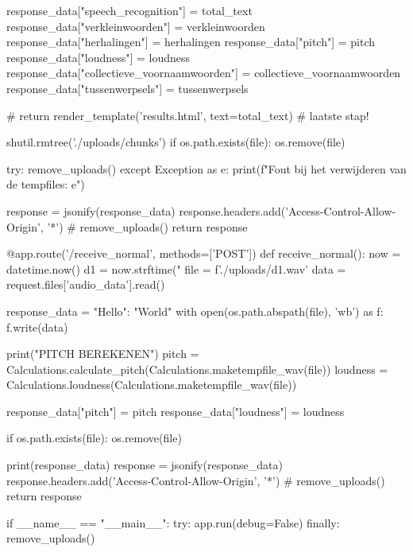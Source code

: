 \begin{python}
   response_data["speech_recognition"] = total_text
   response_data["verkleinwoorden"] = verkleinwoorden
   response_data["herhalingen"] = herhalingen
   response_data["pitch"] = pitch
   response_data["loudness"] = loudness
   response_data["collectieve_voornaamwoorden"] = collectieve_voornaamwoorden
   response_data["tussenwerpsels"] = tussenwerpsels

   # return render_template('results.html', text=total_text)
   # laatste stap!

   shutil.rmtree('./uploads/chunks')
   if os.path.exists(file):
        os.remove(file)

   try:
        remove_uploads()
   except Exception as e:
        print(f"Fout bij het verwijderen van de tempfiles: {e}")

   response = jsonify(response_data)
   response.headers.add('Access-Control-Allow-Origin', '*')
   # remove_uploads()
   return response


@app.route('/receive_normal', methods=['POST'])
def receive_normal():
   now = datetime.now()
   d1 = now.strftime("%
   file = f'./uploads/{d1}.wav'
   data = request.files['audio_data'].read()

   response_data = {"Hello": "World"}
   with open(os.path.abspath(file), 'wb') as f:
   f.write(data)

   print("PITCH BEREKENEN")
   pitch = Calculations.calculate_pitch(Calculations.maketempfile_wav(file))
   loudness = Calculations.loudness(Calculations.maketempfile_wav(file))

   response_data["pitch"] = pitch
   response_data["loudness"] = loudness

   if os.path.exists(file):
        os.remove(file)

   print(response_data)
   response = jsonify(response_data)
   response.headers.add('Access-Control-Allow-Origin', '*')
   # remove_uploads()
   return response


if __name__ == "__main__":
   try:
        app.run(debug=False)
   finally:
        remove_uploads()

\end{python}

